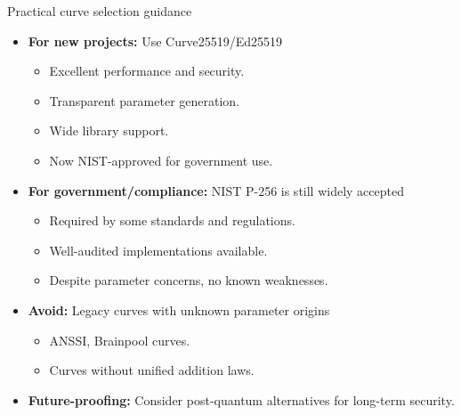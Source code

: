 \documentclass[aspectratio=169, lualatex, handout]{beamer}
\begin{document}
\begin{frame}{Practical curve selection guidance}
	\begin{itemize}[<+->]
		\item \textbf{For new projects:} Use Curve25519/Ed25519
		      \begin{itemize}
			      \item Excellent performance and security.
			      \item Transparent parameter generation.
			      \item Wide library support.
			      \item Now NIST-approved for government use.
		      \end{itemize}
		\item \textbf{For government/compliance:} NIST P-256 is still widely accepted
		      \begin{itemize}
			      \item Required by some standards and regulations.
			      \item Well-audited implementations available.
			      \item Despite parameter concerns, no known weaknesses.
		      \end{itemize}
		\item \textbf{Avoid:} Legacy curves with unknown parameter origins
		      \begin{itemize}
			      \item ANSSI, Brainpool curves.
			      \item Curves without unified addition laws.
		      \end{itemize}
		\item \textbf{Future-proofing:} Consider post-quantum alternatives for long-term security.
	\end{itemize}
\end{frame}
\end{document}
